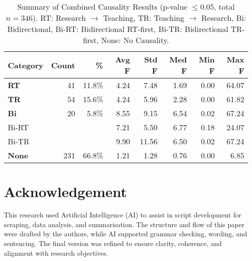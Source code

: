\documentclass[conference]{IEEEtran}
\begin{document}
\begin{table}
	\centering
	\caption{Summary of Combined Causality Results (p-value $\leq 0.05$, total $n=346$). RT: Research $\rightarrow$ Teaching, TR: Teaching $\rightarrow$ Research, Bi: Bidirectional, Bi-RT: Bidirectional RT-first, Bi-TR: Bidirectional TR-first, None: No Causality.}
	\begin{tabular}{|l|r|r|r|r|r|r|r|}
		\hline
		\textbf{Category} & \textbf{Count} & \textbf{\%} & \textbf{Avg F} & \textbf{Std F} & \textbf{Med F} & \textbf{Min F} & \textbf{Max F} \\ \hline
		\textbf{RT}               & 41  & 11.8\% & 4.24  & 7.48  & 1.69  & 0.00  & 64.07 \\ \hline
		\textbf{TR}               & 54  & 15.6\% & 4.24  & 5.96  & 2.28  & 0.00  & 61.82 \\ \hline
		\textbf{Bi}               & 20  & 5.8\%  & 8.55  & 9.15  & 6.54  & 0.02  & 67.24 \\ \hline
		\hfill Bi-RT            &   &   & 7.21  & 5.50  & 6.77  & 0.18  & 24.07 \\ \hline
		\hfill Bi-TR            &   &   & 9.90  & 11.56 & 6.50  & 0.02  & 67.24 \\ \hline
		\textbf{None}             & 231 & 66.8\% & 1.21  & 1.28  & 0.76  & 0.00  & 6.85  \\ \hline
	\end{tabular}
\end{table}



\section*{Acknowledgement}

This research used Artificial Intelligence (AI) to assist in script development for scraping, data analysis, and summarisation. The structure and flow of this paper were drafted by the authors, while AI supported grammar checking, wording, and sentencing. The final version was refined to ensure clarity, coherence, and alignment with research objectives.



\end{document}
